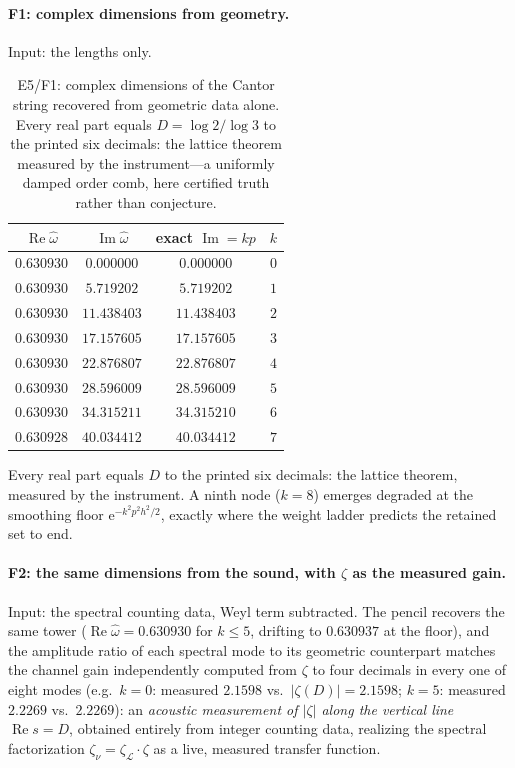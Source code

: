 \documentclass[11pt, a4paper]{article}
\theoremstyle{definition}
\theoremstyle{remark}
\newcommand{\ee}{\mathrm{e}}
\begin{document}
\paragraph{F1: complex dimensions from geometry.} Input: the lengths only.

\begin{table}[ht]
\centering\small
\begin{tabular}{cccc}
\toprule
$\operatorname{Re}\hat\omega$ & $\operatorname{Im}\hat\omega$ & exact
$\operatorname{Im}=kp$ & $k$ \\
\midrule
$0.630930$ & $0.000000$  & $0.000000$  & $0$ \\
$0.630930$ & $5.719202$  & $5.719202$  & $1$ \\
$0.630930$ & $11.438403$ & $11.438403$ & $2$ \\
$0.630930$ & $17.157605$ & $17.157605$ & $3$ \\
$0.630930$ & $22.876807$ & $22.876807$ & $4$ \\
$0.630930$ & $28.596009$ & $28.596009$ & $5$ \\
$0.630930$ & $34.315211$ & $34.315210$ & $6$ \\
$0.630928$ & $40.034412$ & $40.034412$ & $7$ \\
\bottomrule
\end{tabular}
\caption{E5/F1: complex dimensions of the Cantor string recovered from
geometric data alone. Every real part equals $D=\log2/\log3$ to the
printed six decimals: the lattice theorem measured by the instrument---a
uniformly damped order comb, here certified truth rather than conjecture.}
\label{tab:E5}
\end{table}

Every real part equals $D$ to the printed six decimals: the lattice
theorem, measured by the instrument. A ninth node ($k=8$) emerges degraded
at the smoothing floor $\ee^{-k^{2}p^{2}h^{2}/2}$, exactly where the
weight ladder predicts the retained set to end.

\paragraph{F2: the same dimensions from the sound, with $\zeta$ as the
measured gain.} Input: the spectral counting data, Weyl term subtracted.
The pencil recovers the same tower ($\operatorname{Re}\hat\omega=0.630930$
for $k\le5$, drifting to $0.630937$ at the floor), and the amplitude ratio
of each spectral mode to its geometric counterpart matches the channel
gain independently computed from $\zeta$ to four decimals in every one of
eight modes (e.g.\ $k=0$: measured $2.1598$ vs.\ $|\zeta(D)|=2.1598$;
$k=5$: measured $2.2269$ vs.\ $2.2269$): an \emph{acoustic measurement of
$|\zeta|$ along the vertical line $\operatorname{Re}s=D$}, obtained
entirely from integer counting data, realizing the spectral factorization
$\zeta_\nu=\zeta_{\mathcal{L}}\cdot\zeta$ as a live, measured transfer
function.
\end{document}
